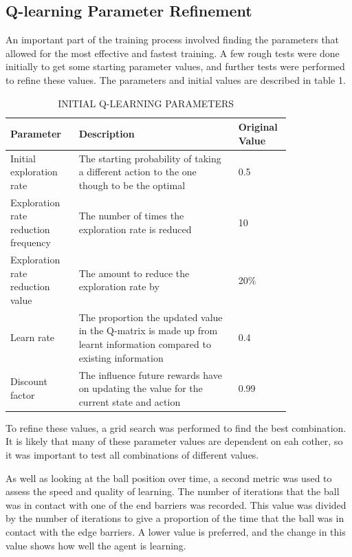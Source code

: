 \documentclass[12pt,a4paper]{article}
\begin{document}
\subsection{Q-learning Parameter Refinement}
An important part of the training process involved finding the parameters that allowed for the most effective and fastest training. A few rough tests were done initially to get some starting parameter values, and further tests were performed to refine these values. The parameters and initial values are described in table 1.
\begin{table}[htb]
\centering
\caption{INITIAL Q-LEARNING PARAMETERS}
\vspace*{6pt}
\label{q_params}
\begin{tabular}{>{\raggedright}p{0.21\linewidth}p{0.5\linewidth}p{0.1\linewidth}}\hline
Parameter & Description& Original Value\\ \hline\hline
Initial exploration rate & The starting probability of taking a different action to the one though to be the optimal & 0.5\\ \hline
Exploration rate reduction frequency & The number of times the exploration rate is reduced & 10\\ \hline
Exploration rate reduction value & The amount to reduce the exploration rate by & 20\% \\\hline
Learn rate & The proportion the updated value in the Q-matrix is made up from learnt information compared to existing information & 0.4 \\\hline
Discount factor & The influence future rewards have on updating the value for the current state and action & 0.99 \\\hline
\end{tabular}
\end{table}
To refine these values, a grid search was performed to find the best combination. It is likely that many of these parameter values are dependent on eah cother, so it was important to test all combinations of different values.

As well as looking at the ball position over time, a second metric was used to assess the speed and quality of learning. The number of iterations that the ball was in contact with one of the end barriers was recorded. This value was divided by the number of iterations to give a proportion of the time that the ball was in contact with the edge barriers. A lower value is preferred, and the change in this value shows how well the agent is learning. 
\end{document}
